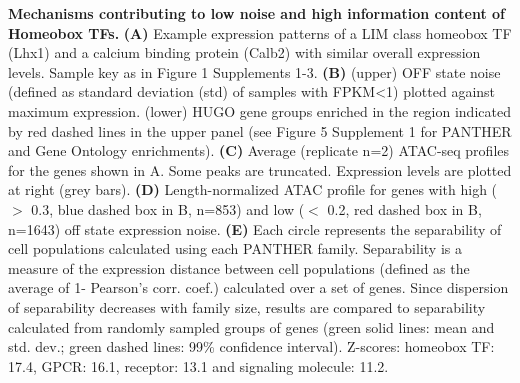 \textbf{Mechanisms contributing to low noise and high information content of Homeobox TFs.} \textbf{(A)} Example expression patterns of a LIM class homeobox TF (Lhx1) and a calcium binding protein (Calb2) with similar overall expression levels. Sample key as in Figure 1 Supplements 1-3. \textbf{(B)} (upper) OFF state noise (defined as standard deviation (std) of samples with FPKM<1) plotted against maximum expression. (lower) HUGO gene groups enriched in the region indicated by red dashed lines in the upper panel (see Figure 5 Supplement 1 for PANTHER and Gene Ontology enrichments). \textbf{(C)} Average (replicate n=2) ATAC-seq profiles for the genes shown in A. Some peaks are truncated. Expression levels are plotted at right (grey bars). \textbf{(D)} Length-normalized ATAC profile for genes with high ($>$ 0.3, blue dashed box in B, n=853) and low ($<$ 0.2, red dashed box in B, n=1643) off state expression noise. \textbf{(E)} Each circle represents the separability of cell populations calculated using each PANTHER family. Separability is a measure of the expression distance between cell populations (defined as the average of 1- Pearson’s corr. coef.) calculated over a set of genes. Since dispersion of separability decreases with family size, results are compared to separability calculated from randomly sampled groups of genes (green solid lines: mean and std. dev.; green dashed lines: 99\% confidence interval). Z-scores: homeobox TF: 17.4, GPCR: 16.1, receptor: 13.1 and signaling molecule: 11.2.